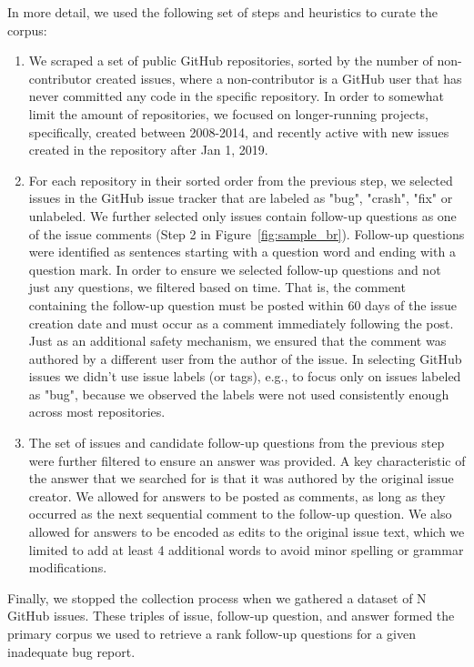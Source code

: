 In more detail, we used the following set of steps and heuristics to curate the corpus:
\begin{enumerate}
\item We scraped a set of public GitHub repositories, sorted by the number of
non-contributor created issues, where a non-contributor is a GitHub user that has never
committed any code in the specific repository. In order to somewhat limit the amount of repositories,
we focused on longer-running projects, specifically, created between 2008-2014, and recently
active with new issues created in the repository after Jan 1, 2019.
\item For each repository in their sorted order from the previous step, we selected issues in the GitHub issue tracker
that are labeled as "bug", "crash", "fix" or unlabeled. We further selected only issues contain follow-up questions as one of the issue comments (Step 2 in Figure~\ref{fig:sample_br}).  Follow-up questions were identified as sentences starting with a question word and ending with a question mark. In order to ensure we selected follow-up questions and not just
any questions, we filtered based on time. That is, the comment containing the follow-up question must be posted
within 60 days of the issue creation date and must occur as a comment immediately following the post. Just as an additional safety mechanism,
we ensured that the comment was authored by a different user from the author of the issue. In selecting GitHub issues
we didn't use issue labels (or tags), e.g., to focus only on issues labeled as "bug", because we observed the labels were not
used consistently enough across most repositories.
\item The set of issues and candidate follow-up questions from the previous step were further filtered to
ensure an answer was provided. A key characteristic of the answer that we searched for is that it was authored
by the original issue creator. We allowed for answers to be posted as comments, as long as they occurred as the next sequential comment
to the follow-up question. We also allowed for answers to be encoded as edits to the original issue text, which we limited to add at least 4 additional words to avoid minor spelling or grammar modifications.
\end{enumerate}

Finally, we stopped the collection process when we gathered a dataset of N GitHub issues. These triples of
issue, follow-up question, and answer formed the primary corpus we used to retrieve a rank follow-up questions
for a given inadequate bug report.

